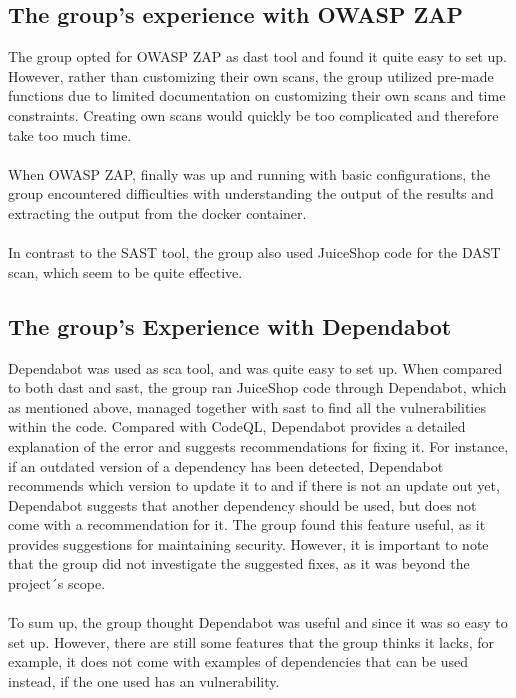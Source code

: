\subsection{The group's experience with OWASP ZAP}

The group opted for OWASP ZAP as \acrshort{dast} tool and found it quite easy to set up. However, rather than customizing their own scans, the group utilized pre-made functions due to limited documentation on customizing their own scans and time constraints. Creating own scans would quickly be too complicated and therefore take too much time. 
\\~\\
When OWASP ZAP, finally was up and running with basic configurations, the group encountered difficulties with understanding the output of the results and extracting the output from the docker container. 
\\~\\
In contrast to the SAST tool, the group also used JuiceShop code for the  DAST scan, which seem to be quite effective. 



\subsection{The group's Experience with Dependabot}
Dependabot was used as \acrshort{sca} tool, and was quite easy to set up. When compared to both \acrshort{dast} and \acrshort{sast}, the group ran JuiceShop code through Dependabot, which as mentioned above, managed together with \acrshort{sast} to find all the vulnerabilities within the code. 
Compared with CodeQL, Dependabot provides a detailed explanation of the error and suggests recommendations for fixing it. For instance, if an outdated version of a dependency has been detected, Dependabot recommends which version to update it to and if there is not an update out yet, Dependabot suggests that another dependency should be used, but does not come with a recommendation for it.  The group found this feature useful, as it provides suggestions for maintaining security. However, it is important to note that the group did not investigate the suggested fixes, as it was beyond the project´s scope.
\\~\\
To sum up, the group thought Dependabot was useful and since it was so easy to set up. However, there are still some features that the group thinks it lacks, for example, it does not come with examples of dependencies that can be used instead, if the one used has an vulnerability. 

